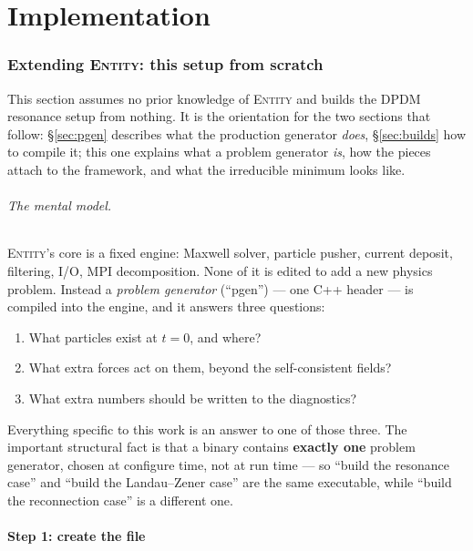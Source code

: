 \documentclass[11pt,a4paper]{article}
\begin{document}
\clearpage
\part{Implementation}
\label{part:impl}

\section{Extending \textsc{Entity}: this setup from scratch}
\label{sec:fromscratch}

This section assumes no prior knowledge of \textsc{Entity} and builds the DPDM
resonance setup from nothing. It is the orientation for the two sections that follow:
\S\ref{sec:pgen} describes what the production generator \emph{does},
\S\ref{sec:builds} how to compile it; this one explains what a problem generator
\emph{is}, how the pieces attach to the framework, and what the irreducible minimum
looks like.

\paragraph{The mental model.} \textsc{Entity}'s core is a fixed engine: Maxwell
solver, particle pusher, current deposit, filtering, I/O, MPI decomposition. None of
it is edited to add a new physics problem. Instead a \emph{problem generator}
(``pgen'') --- one C++ header --- is compiled into the engine, and it answers three
questions:

\begin{enumerate}[nosep]
  \item What particles exist at $t=0$, and where?
  \item What extra forces act on them, beyond the self-consistent fields?
  \item What extra numbers should be written to the diagnostics?
\end{enumerate}

Everything specific to this work is an answer to one of those three. The important
structural fact is that a binary contains \textbf{exactly one} problem generator,
chosen at configure time, not at run time --- so ``build the resonance case'' and
``build the Landau--Zener case'' are the same executable, while ``build the
reconnection case'' is a different one.

\subsection{Step 1: create the file}
\end{document}
